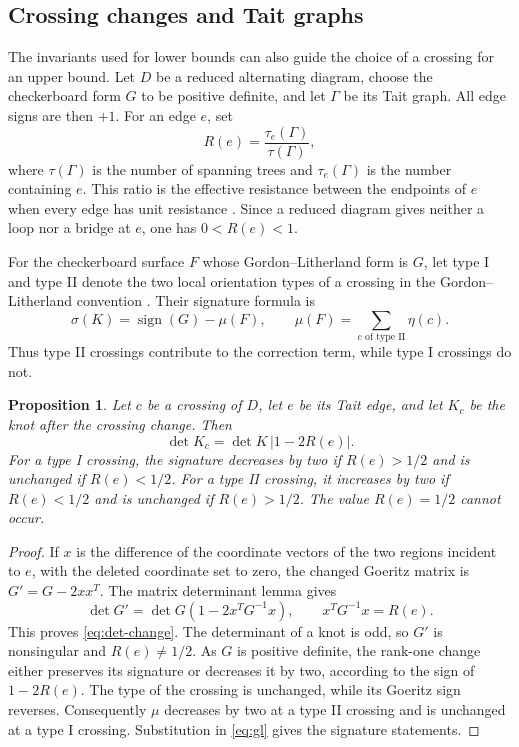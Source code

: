 \documentclass[12pt, oneside]{amsart}
\newtheorem{proposition}[theorem]{Proposition}
\newcommand{\Reff}{R}
\begin{document}
\subsection{Crossing changes and Tait graphs}\label{sec:electrical}

The invariants used for lower bounds can also guide the choice of a crossing for an upper
bound. Let $D$ be a reduced alternating diagram, choose the checkerboard form $G$ to be
positive definite, and let $\Gamma$ be its Tait graph. All edge signs are then $+1$.
For an edge $e$, set
\[
    \Reff(e)=\frac{\tau_e(\Gamma)}{\tau(\Gamma)},
\]
where $\tau(\Gamma)$ is the number of spanning trees and $\tau_e(\Gamma)$ is the number
containing $e$. This ratio is the effective resistance between the endpoints of $e$ when
every edge has unit resistance \cite{Bollobas}. Since a reduced diagram gives neither
a loop nor a bridge at $e$, one has $0<\Reff(e)<1$.

For the checkerboard surface $F$ whose Gordon--Litherland form is $G$, let type I and type II denote the two local orientation
types of a crossing in the Gordon--Litherland convention \cite{GL}. Their signature
formula is
\begin{equation}\label{eq:gl}
    \sigma(K)=\operatorname{sign}(G)-\mu(F),\qquad
    \mu(F)=\sum_{c\text{ of type II}}\eta(c).
\end{equation}
Thus type II crossings contribute to the correction term, while type I crossings do not.

\begin{proposition}\label{prop:sigma}
Let $c$ be a crossing of $D$, let $e$ be its Tait edge, and let $K_c$ be the knot after
the crossing change. Then
\begin{equation}\label{eq:det-change}
    \det K_c=\det K\,|1-2\Reff(e)|.
\end{equation}
For a type I crossing, the signature decreases by two if $\Reff(e)>1/2$ and is unchanged
if $\Reff(e)<1/2$. For a type II crossing, it increases by two if $\Reff(e)<1/2$ and
is unchanged if $\Reff(e)>1/2$. The value $\Reff(e)=1/2$ cannot occur.
\end{proposition}

\begin{proof}
If $x$ is the difference of the coordinate vectors of the two regions incident to $e$,
with the deleted coordinate set to zero, the changed Goeritz matrix is
$G'=G-2xx^T$. The matrix determinant lemma gives
\[
    \det G'=\det G(1-2x^TG^{-1}x),\qquad x^TG^{-1}x=\Reff(e).
\]
This proves \eqref{eq:det-change}. The determinant of a knot is odd, so $G'$ is
nonsingular and $\Reff(e)\ne1/2$. As $G$ is positive definite, the rank-one change either
preserves its signature or decreases it by two, according to the sign of
$1-2\Reff(e)$. The type of the crossing is unchanged, while its Goeritz sign reverses.
Consequently $\mu$ decreases by two at a type II crossing and is unchanged at a type I
crossing. Substitution in \eqref{eq:gl} gives the signature statements.
\end{proof}
\end{document}
